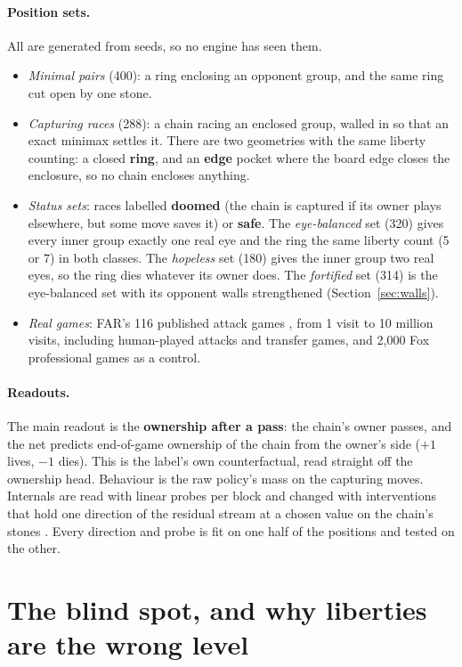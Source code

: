 \documentclass[11pt]{article}
\newcommand{\pos}[1]{$+#1$}
\newcommand{\nega}[1]{$-#1$}
\begin{document}
\paragraph{Position sets.} All are generated from seeds, so no engine has seen them.
\begin{itemize}
\item \emph{Minimal pairs} (400): a ring enclosing an opponent group, and the same ring cut open by one stone.
\item \emph{Capturing races} (288): a chain racing an enclosed group, walled in so that an exact minimax settles it. There are two geometries with the same liberty counting: a closed \textbf{ring}, and an \textbf{edge} pocket where the board edge closes the enclosure, so no chain encloses anything.
\item \emph{Status sets}: races labelled \textbf{doomed} (the chain is captured if its owner plays elsewhere, but some move saves it) or \textbf{safe}. The \emph{eye-balanced} set (320) gives every inner group exactly one real eye and the ring the same liberty count (5 or 7) in both classes. The \emph{hopeless} set (180) gives the inner group two real eyes, so the ring dies whatever its owner does. The \emph{fortified} set (314) is the eye-balanced set with its opponent walls strengthened (Section~\ref{sec:walls}).
\item \emph{Real games}: FAR's 116 published attack games \citep{wang2023adversarial}, from 1 visit to 10 million visits, including human-played attacks and transfer games, and 2,000 Fox professional games \citep{foxdataset} as a control.
\end{itemize}

\paragraph{Readouts.} The main readout is the \textbf{ownership after a pass}: the chain's owner passes, and the net predicts end-of-game ownership of the chain from the owner's side (\pos{1} lives, \nega{1} dies). This is the label's own counterfactual, read straight off the ownership head. Behaviour is the raw policy's mass on the capturing moves. Internals are read with linear probes per block \citep{alain2016probes} and changed with interventions that hold one direction of the residual stream at a chosen value on the chain's stones \citep{meng2022locating}. Every direction and probe is fit on one half of the positions and tested on the other.

\section{The blind spot, and why liberties are the wrong level}
\label{sec:races}
\end{document}
